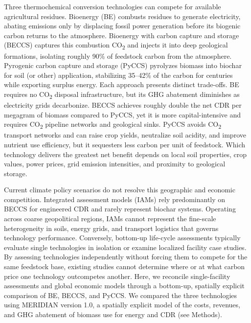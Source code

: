 \documentclass[
  letterpaper,
  twoside,
  twocolumn,
  9pt]{article}
\begin{document}
Three thermochemical conversion technologies can compete for available
agricultural residues. Bioenergy (BE) combusts residues to generate
electricity, abating emissions only by displacing fossil power
generation before its biogenic carbon returns to the atmosphere.
Bioenergy with carbon capture and storage (BECCS) captures this
combustion CO\textsubscript{2} and injects it into deep geological
formations, isolating roughly 90\% of feedstock carbon from the
atmosphere.\citep{fuss2018} Pyrogenic carbon capture and storage (PyCCS)
pyrolyzes biomass into biochar for soil (or other) application,
stabilizing 35--42\% of the carbon for centuries while exporting surplus
energy.\citep{schmidt2019pyccs, woolf2010, lehmann2021biochar} Each
approach presents distinct trade-offs. BE requires no
CO\textsubscript{2} disposal infrastructure, but its GHG abatement
diminishes as electricity grids decarbonize. BECCS achieves roughly
double the net CDR per megagram of biomass compared to
PyCCS,\citep{woolf2016optimal} yet it is more capital-intensive and
requires CO\textsubscript{2} pipeline networks and geological sinks.
PyCCS avoids CO\textsubscript{2} transport networks and can raise crop
yields, neutralize soil acidity, and improve nutrient use
efficiency,\citep{jeffery2017, xu2021, yang2025biochar} but it
sequesters less carbon per unit of feedstock. Which technology delivers
the greatest net benefit depends on local soil properties, crop values,
power prices, grid emission intensities, and proximity to geological
storage.\citep{woolf2016optimal}

Current climate policy scenarios do not resolve this geographic and
economic competition. Integrated assessment models (IAMs) rely
predominantly on BECCS for engineered CDR and rarely represent biochar
systems.\citep{ipcc2022wg3, edwards2026state} Operating across coarse
geopolitical regions, IAMs cannot represent the fine-scale heterogeneity
in soils, energy grids, and transport logistics that governs technology
performance. Conversely, bottom-up life-cycle assessments typically
evaluate single technologies in isolation \citep{roe2021} or examine
localized facility case studies.\citep{peters2015, lefebvre2021} By
assessing technologies independently without forcing them to compete for
the same feedstock base, existing studies cannot determine where or at
what carbon price one technology outcompetes
another.\citep{saldarriaga2025biochar} Here, we reconcile
single-facility assessments and global economic models through a
bottom-up, spatially explicit comparison of BE, BECCS, and PyCCS. We
compared the three technologies using MERIDIAN version 1.0, a spatially
explicit model of the costs, revenues, and GHG abatement of biomass use
for energy and CDR (see Methods).
\end{document}
